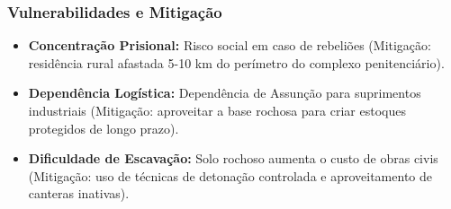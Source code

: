 \subsubsection{Vulnerabilidades e
Mitigação}

\begin{itemize}
\tightlist
\item
  \textbf{Concentração Prisional:} Risco social em caso de rebeliões
  (Mitigação: residência rural afastada 5-10 km do perímetro do complexo
  penitenciário).
\item
  \textbf{Dependência Logística:} Dependência de Assunção para
  suprimentos industriais (Mitigação: aproveitar a base rochosa para
  criar estoques protegidos de longo prazo).
\item
  \textbf{Dificuldade de Escavação:} Solo rochoso aumenta o custo de
  obras civis (Mitigação: uso de técnicas de detonação controlada e
  aproveitamento de canteras inativas).
\end{itemize}

